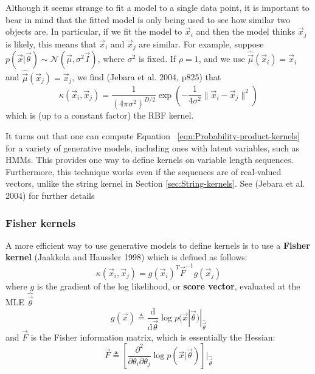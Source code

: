 Although it seems strange to fit a model to a single data point, it is important to bear in mind that the fitted model is only being used to see how similar two objects are. In particular, if we fit the model to $\vec{x}_i$ and then the model thinks $\vec{x}_j$ is likely, this means that $\vec{x}_i$ and $\vec{x}_j$ are similar. For example, suppose $p(\vec{x}|\vec{\theta}) \sim \mathcal{N}(\vec{\mu},\sigma^2\vec{I})$, where $\sigma^2$ is fixed. If $\rho=1$, and we use $\hat{\vec{\mu}}(\vec{x}_i)=\vec{x}_i$ and $\hat{\vec{\mu}}(\vec{x}_j)=\vec{x}_j$, we find (Jebara et al. 2004, p825) that
\begin{equation}
\kappa(\vec{x}_i,\vec{x}_j)=\frac{1}{(4\pi\sigma^2)^{D/2}}\exp\left(-\frac{1}{4\sigma^2}\lVert\vec{x}_i-\vec{x}_j\rVert^2\right)
\end{equation}
which is (up to a constant factor) the RBF kernel.

It turns out that one can compute Equation ~\ref{eqn:Probability-product-kernels} for a variety of generative models, including ones with latent variables, such as HMMs. This provides one way to define kernels on variable length sequences. Furthermore, this technique works even if the sequences are of real-valued vectors, unlike the string kernel in Section \ref{sec:String-kernels}. See (Jebara et al. 2004) for further details


\subsubsection{Fisher kernels}
A more efficient way to use generative models to define kernels is to use a \textbf{Fisher kernel} (Jaakkola and Haussler 1998) which is defined as follows:
\begin{equation}
\kappa(\vec{x}_i,\vec{x}_j)=g(\vec{x}_i)^T\vec{F}^{-1}g(\vec{x}_j)
\end{equation}
where $g$ is the gradient of the log likelihood, or \textbf{score vector}, evaluated at the MLE $\hat{\vec{\theta}}$
\begin{equation}
g(\vec{x}) \triangleq \frac{\mathrm{d}}{\mathrm{d}\vec{\theta}}\log p(\vec{x}|\vec{\theta})|_{\hat{\vec{\theta}}}
\end{equation}
and $\vec{F}$ is the Fisher information matrix, which is essentially the Hessian:
\begin{equation}
\vec{F} \triangleq \left[\frac{\partial^2}{\partial \theta_i \partial \theta_j}\log p(\vec{x}|\vec{\theta})\right]|_{\hat{\vec{\theta}}}
\end{equation}

